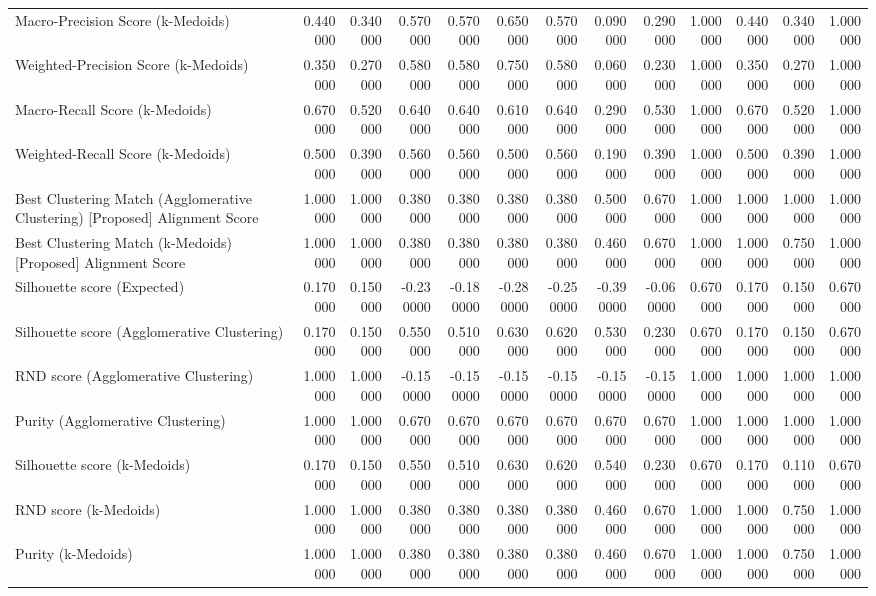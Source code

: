 \begin{tabular}{lrrrrrrrrrrrr}
Macro-Precision Score (k-Medoids) & 0.440000 & 0.340000 & 0.570000 & 0.570000 & 0.650000 & 0.570000 & 0.090000 & 0.290000 & 1.000000 & 0.440000 & 0.340000 & 1.000000 \\
Weighted-Precision Score (k-Medoids) & 0.350000 & 0.270000 & 0.580000 & 0.580000 & 0.750000 & 0.580000 & 0.060000 & 0.230000 & 1.000000 & 0.350000 & 0.270000 & 1.000000 \\
Macro-Recall Score (k-Medoids) & 0.670000 & 0.520000 & 0.640000 & 0.640000 & 0.610000 & 0.640000 & 0.290000 & 0.530000 & 1.000000 & 0.670000 & 0.520000 & 1.000000 \\
Weighted-Recall Score (k-Medoids) & 0.500000 & 0.390000 & 0.560000 & 0.560000 & 0.500000 & 0.560000 & 0.190000 & 0.390000 & 1.000000 & 0.500000 & 0.390000 & 1.000000 \\
Best Clustering Match (Agglomerative Clustering) [Proposed] Alignment Score & 1.000000 & 1.000000 & 0.380000 & 0.380000 & 0.380000 & 0.380000 & 0.500000 & 0.670000 & 1.000000 & 1.000000 & 1.000000 & 1.000000 \\
Best Clustering Match (k-Medoids) [Proposed] Alignment Score & 1.000000 & 1.000000 & 0.380000 & 0.380000 & 0.380000 & 0.380000 & 0.460000 & 0.670000 & 1.000000 & 1.000000 & 0.750000 & 1.000000 \\
Silhouette score (Expected) & 0.170000 & 0.150000 & -0.230000 & -0.180000 & -0.280000 & -0.250000 & -0.390000 & -0.060000 & 0.670000 & 0.170000 & 0.150000 & 0.670000 \\
Silhouette score (Agglomerative Clustering) & 0.170000 & 0.150000 & 0.550000 & 0.510000 & 0.630000 & 0.620000 & 0.530000 & 0.230000 & 0.670000 & 0.170000 & 0.150000 & 0.670000 \\
RND score (Agglomerative Clustering) & 1.000000 & 1.000000 & -0.150000 & -0.150000 & -0.150000 & -0.150000 & -0.150000 & -0.150000 & 1.000000 & 1.000000 & 1.000000 & 1.000000 \\
Purity (Agglomerative Clustering) & 1.000000 & 1.000000 & 0.670000 & 0.670000 & 0.670000 & 0.670000 & 0.670000 & 0.670000 & 1.000000 & 1.000000 & 1.000000 & 1.000000 \\
Silhouette score (k-Medoids) & 0.170000 & 0.150000 & 0.550000 & 0.510000 & 0.630000 & 0.620000 & 0.540000 & 0.230000 & 0.670000 & 0.170000 & 0.110000 & 0.670000 \\
RND score (k-Medoids) & 1.000000 & 1.000000 & 0.380000 & 0.380000 & 0.380000 & 0.380000 & 0.460000 & 0.670000 & 1.000000 & 1.000000 & 0.750000 & 1.000000 \\
Purity (k-Medoids) & 1.000000 & 1.000000 & 0.380000 & 0.380000 & 0.380000 & 0.380000 & 0.460000 & 0.670000 & 1.000000 & 1.000000 & 0.750000 & 1.000000 \\
\bottomrule
\end{tabular}
